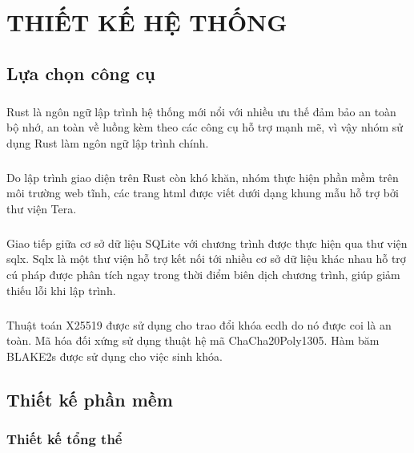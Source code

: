 \chapter{THIẾT KẾ HỆ THỐNG}
\section{Lựa chọn công cụ}

\paragraph{}
Rust là ngôn ngữ lập trình hệ thống mới nổi với nhiều ưu thế đảm bảo an toàn bộ nhớ, an toàn về luồng kèm theo các công cụ hỗ trợ mạnh mẽ, vì vậy nhóm sử dụng Rust làm ngôn ngữ lập trình chính.

\paragraph{}
Do lập trình giao diện trên Rust còn khó khăn, nhóm thực hiện phần mềm trên môi trường web tĩnh, các trang html được viết dưới dạng khung mẫu hỗ trợ bởi thư viện Tera.

\paragraph{}
Giao tiếp giữa cơ sở dữ liệu SQLite với chương trình được thực hiện qua thư viện sqlx. Sqlx là một thư viện hỗ trợ kết nối tới nhiều cơ sở dữ liệu khác nhau hỗ trợ cú pháp được phân tích ngay trong thời điểm biên dịch chương trình, giúp giảm thiếu lỗi khi lập trình.

\paragraph{}
Thuật toán X25519 được sử dụng cho trao đổi khóa \gls{ecdh} do nó được coi là an toàn. Mã hóa đối xứng sử dụng thuật hệ mã ChaCha20Poly1305. Hàm băm BLAKE2s được sử dụng cho việc sinh khóa.

\section{Thiết kế phần mềm}

\subsection{Thiết kế tổng thể}

